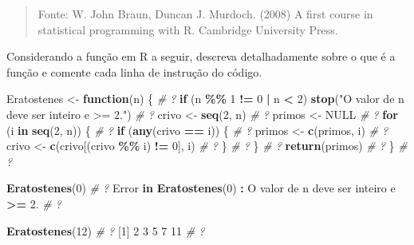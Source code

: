 \documentclass[
]{article}
\newenvironment{Shaded}{\begin{snugshade}}{\end{snugshade}}
\newcommand{\CommentTok}[1]{\textcolor[rgb]{0.56,0.35,0.01}{\textit{#1}}}
\newcommand{\ConstantTok}[1]{\textcolor[rgb]{0.56,0.35,0.01}{#1}}
\newcommand{\ControlFlowTok}[1]{\textcolor[rgb]{0.13,0.29,0.53}{\textbf{#1}}}
\newcommand{\DecValTok}[1]{\textcolor[rgb]{0.00,0.00,0.81}{#1}}
\newcommand{\FloatTok}[1]{\textcolor[rgb]{0.00,0.00,0.81}{#1}}
\newcommand{\FunctionTok}[1]{\textcolor[rgb]{0.13,0.29,0.53}{\textbf{#1}}}
\newcommand{\NormalTok}[1]{#1}
\newcommand{\OtherTok}[1]{\textcolor[rgb]{0.56,0.35,0.01}{#1}}
\newcommand{\SpecialCharTok}[1]{\textcolor[rgb]{0.81,0.36,0.00}{\textbf{#1}}}
\newcommand{\StringTok}[1]{\textcolor[rgb]{0.31,0.60,0.02}{#1}}
\begin{document}
\begin{quote}
Fonte: W. John Braun, Duncan J. Murdoch. (2008) A first course in
statistical programming with R. Cambridge University Press.
\end{quote}

Considerando a função em R a seguir, descreva detalhadamente sobre o que
é a função e comente cada linha de instrução do código.

\begin{Shaded}
\begin{Highlighting}[]
\NormalTok{Eratostenes }\OtherTok{\textless{}{-}} \ControlFlowTok{function}\NormalTok{(n) \{ }\CommentTok{\# ?}
\ControlFlowTok{if}\NormalTok{ (n }\SpecialCharTok{\%\%} \DecValTok{1} \SpecialCharTok{!=} \DecValTok{0} \SpecialCharTok{|}\NormalTok{ n }\SpecialCharTok{\textless{}} \DecValTok{2}\NormalTok{) }\FunctionTok{stop}\NormalTok{(}\StringTok{"O valor de n deve ser inteiro e \textgreater{}= 2."}\NormalTok{) }\CommentTok{\# ?}
\NormalTok{crivo }\OtherTok{\textless{}{-}} \FunctionTok{seq}\NormalTok{(}\DecValTok{2}\NormalTok{, n) }\CommentTok{\# ?}
\NormalTok{primos }\OtherTok{\textless{}{-}} \ConstantTok{NULL} \CommentTok{\# ?}
\ControlFlowTok{for}\NormalTok{ (i }\ControlFlowTok{in} \FunctionTok{seq}\NormalTok{(}\DecValTok{2}\NormalTok{, n)) \{ }\CommentTok{\# ?}
\ControlFlowTok{if}\NormalTok{ (}\FunctionTok{any}\NormalTok{(crivo }\SpecialCharTok{==}\NormalTok{ i)) \{ }\CommentTok{\# ?}
\NormalTok{primos }\OtherTok{\textless{}{-}} \FunctionTok{c}\NormalTok{(primos, i) }\CommentTok{\# ?}
\NormalTok{crivo }\OtherTok{\textless{}{-}} \FunctionTok{c}\NormalTok{(crivo[(crivo }\SpecialCharTok{\%\%}\NormalTok{ i) }\SpecialCharTok{!=} \DecValTok{0}\NormalTok{], i) }\CommentTok{\# ?}
\NormalTok{\} }\CommentTok{\# ?}
\NormalTok{\} }\CommentTok{\# ?}
\FunctionTok{return}\NormalTok{(primos) }\CommentTok{\# ?}
\NormalTok{\} }\CommentTok{\# ?}

\FunctionTok{Eratostenes}\NormalTok{(}\DecValTok{0}\NormalTok{) }\CommentTok{\# ?}
\NormalTok{Error }\ControlFlowTok{in} \FunctionTok{Eratostenes}\NormalTok{(}\DecValTok{0}\NormalTok{) }\SpecialCharTok{:}\NormalTok{ O valor de n deve ser inteiro e }\SpecialCharTok{\textgreater{}=} \FloatTok{2.} \CommentTok{\# ?}

\FunctionTok{Eratostenes}\NormalTok{(}\DecValTok{12}\NormalTok{) }\CommentTok{\# ?}
\NormalTok{[}\DecValTok{1}\NormalTok{]  }\DecValTok{2}  \DecValTok{3}  \DecValTok{5}  \DecValTok{7} \DecValTok{11} \CommentTok{\# ?}
\end{Highlighting}
\end{Shaded}
\end{document}
